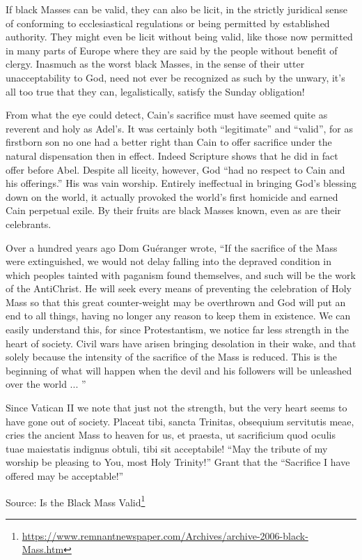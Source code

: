 If black Masses can be valid, they can also be licit, in the strictly juridical sense of conforming to ecclesiastical regulations or being permitted by established authority. They might even be licit without being valid, like those now permitted in many parts of Europe where they are said by the people without benefit of clergy. Inasmuch as the worst black Masses, in the sense of their utter unacceptability to God, need not ever be recognized as such by the unwary, it's all too true that they can, legalistically, satisfy the Sunday obligation!

From what the eye could detect, Cain's sacrifice must have seemed quite as reverent and holy as Adel's. It was certainly both ``legitimate'' and ``valid'', for as firstborn son no one had a better right than Cain to offer sacrifice under the natural dispensation then in effect. Indeed Scripture shows that he did in fact offer before Abel. Despite all liceity, however, God ``had no respect to Cain and his offerings.'' His was vain worship. Entirely ineffectual in bringing God's blessing down on the world, it actually provoked the world's first homicide and earned Cain perpetual exile. By their fruits are black Masses known, even as are their celebrants.

Over a hundred years ago Dom Guéranger wrote, ``If the sacrifice of the Mass were extinguished, we would not delay falling into the depraved condition in which peoples tainted with paganism found themselves, and such will be the work of the AntiChrist. He will seek every means of preventing the celebration of Holy Mass so that this great counter-weight may be overthrown and God will put an end to all things, having no longer any reason to keep them in existence. We can easily understand this, for since Protestantism, we notice far less strength in the heart of society. Civil wars have arisen bringing desolation in their wake, and that solely because the intensity of the sacrifice of the Mass is reduced. This is the beginning of what will happen when the devil and his followers will be unleashed over the world ... ''

Since Vatican II we note that just not the strength, but the very heart seems to have gone out of society. Placeat tibi, sancta Trinitas, obsequium servitutis meae, cries the ancient Mass to heaven for us, et praesta, ut sacrificium quod oculis tuae maiestatis indignus obtuli, tibi sit acceptabile! ``May the tribute of my worship be pleasing to You, most Holy Trinity!'' Grant that the ``Sacrifice I have offered may be acceptable!''

Source: Is the Black Mass Valid\footnote{\url{https://www.remnantnewspaper.com/Archives/archive-2006-black-Mass.htm}}

